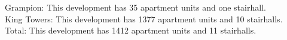 {Grampion}: This development has 35 apartment units and one stairhall.\\{King Towers}: This development has 1377 apartment units and 10 stairhalls.\\{Total}: This development has 1412 apartment units and 11 stairhalls.\\